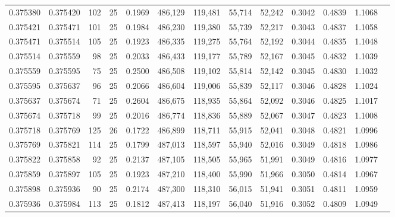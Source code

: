 \begin{tabular}{rrrrrrrrrrrrr}
0.375380 & 0.375420 &   102 &  25 &                                     0.1969 & 486,129 & 119,481 &  55,714 &  52,242 & 0.3042 & 0.4839 & 1.1068 \\
0.375421 & 0.375471 &   101 &  25 &                                     0.1984 & 486,230 & 119,380 &  55,739 &  52,217 & 0.3043 & 0.4837 & 1.1058 \\
0.375471 & 0.375514 &   105 &  25 &                                     0.1923 & 486,335 & 119,275 &  55,764 &  52,192 & 0.3044 & 0.4835 & 1.1048 \\
0.375514 & 0.375559 &    98 &  25 &                                     0.2033 & 486,433 & 119,177 &  55,789 &  52,167 & 0.3045 & 0.4832 & 1.1039 \\
0.375559 & 0.375595 &    75 &  25 &                                     0.2500 & 486,508 & 119,102 &  55,814 &  52,142 & 0.3045 & 0.4830 & 1.1032 \\
0.375595 & 0.375637 &    96 &  25 &                                     0.2066 & 486,604 & 119,006 &  55,839 &  52,117 & 0.3046 & 0.4828 & 1.1024 \\
0.375637 & 0.375674 &    71 &  25 &                                     0.2604 & 486,675 & 118,935 &  55,864 &  52,092 & 0.3046 & 0.4825 & 1.1017 \\
0.375674 & 0.375718 &    99 &  25 &                                     0.2016 & 486,774 & 118,836 &  55,889 &  52,067 & 0.3047 & 0.4823 & 1.1008 \\
0.375718 & 0.375769 &   125 &  26 &                                     0.1722 & 486,899 & 118,711 &  55,915 &  52,041 & 0.3048 & 0.4821 & 1.0996 \\
0.375769 & 0.375821 &   114 &  25 &                                     0.1799 & 487,013 & 118,597 &  55,940 &  52,016 & 0.3049 & 0.4818 & 1.0986 \\
0.375822 & 0.375858 &    92 &  25 &                                     0.2137 & 487,105 & 118,505 &  55,965 &  51,991 & 0.3049 & 0.4816 & 1.0977 \\
0.375859 & 0.375897 &   105 &  25 &                                     0.1923 & 487,210 & 118,400 &  55,990 &  51,966 & 0.3050 & 0.4814 & 1.0967 \\
0.375898 & 0.375936 &    90 &  25 &                                     0.2174 & 487,300 & 118,310 &  56,015 &  51,941 & 0.3051 & 0.4811 & 1.0959 \\
0.375936 & 0.375984 &   113 &  25 &                                     0.1812 & 487,413 & 118,197 &  56,040 &  51,916 & 0.3052 & 0.4809 & 1.0949 \\

\end{tabular}
